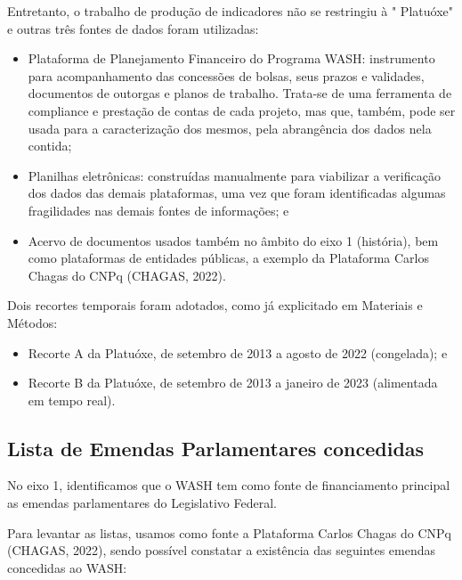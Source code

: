 Entretanto, o trabalho de produção de indicadores não se restringiu à " Platuóxe" e outras três fontes de dados foram utilizadas:


\begin{itemize}
\item Plataforma de Planejamento Financeiro do Programa WASH: instrumento para acompanhamento das concessões de bolsas, seus prazos e validades, documentos de outorgas e planos de trabalho. Trata-se de uma ferramenta de compliance e prestação de contas de cada projeto, mas que, também, pode ser usada para a caracterização dos mesmos, pela abrangência dos dados nela contida;
\item Planilhas eletrônicas: construídas  manualmente para viabilizar a verificação dos dados das demais plataformas, uma vez que foram identificadas algumas fragilidades 
nas demais fontes de informações; e

\item Acervo de documentos usados também no âmbito do eixo 1 (história), bem como plataformas de entidades públicas, a exemplo da Plataforma Carlos Chagas do CNPq (CHAGAS, 2022).
\end{itemize}

Dois recortes temporais foram adotados, como já explicitado em Materiais e Métodos:


\begin{itemize}
\item Recorte A da Platuóxe, de setembro de 2013 a agosto de 2022 (congelada); e
\item Recorte B da Platuóxe, de setembro de 2013 a janeiro de 2023 (alimentada em tempo real).
\end{itemize}

\subsection[Lista de Emendas Parlamentares concedidas]{Lista de Emendas Parlamentares concedidas}\label{Lista de Emendas Parlamentares concedidas}
No eixo 1, identificamos que o WASH tem como fonte de financiamento principal as emendas parlamentares do Legislativo Federal.

Para levantar as listas, usamos como fonte a Plataforma Carlos Chagas do CNPq (CHAGAS, 2022), sendo possível constatar a existência das seguintes emendas concedidas ao WASH:



